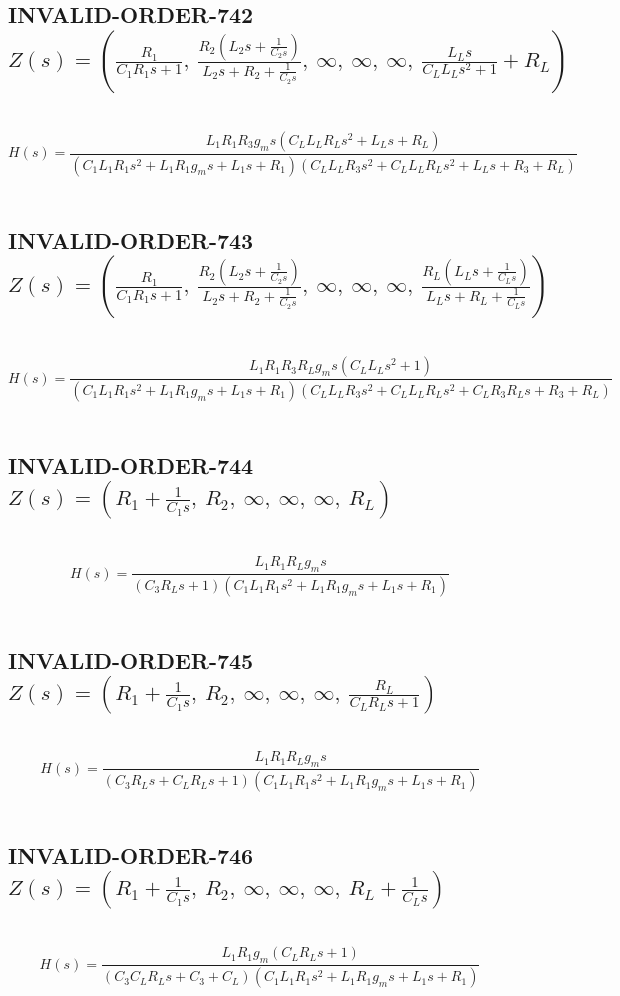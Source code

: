 \documentclass{article}
\begin{document}
\subsection{INVALID-ORDER-742 $Z(s) = \left( \frac{R_{1}}{C_{1} R_{1} s + 1}, \  \frac{R_{2} \left(L_{2} s + \frac{1}{C_{2} s}\right)}{L_{2} s + R_{2} + \frac{1}{C_{2} s}}, \  \infty, \  \infty, \  \infty, \  \frac{L_{L} s}{C_{L} L_{L} s^{2} + 1} + R_{L}\right)$ } \ 
\textbf{\[H(s) = \frac{L_{1} R_{1} R_{3} g_{m} s \left(C_{L} L_{L} R_{L} s^{2} + L_{L} s + R_{L}\right)}{\left(C_{1} L_{1} R_{1} s^{2} + L_{1} R_{1} g_{m} s + L_{1} s + R_{1}\right) \left(C_{L} L_{L} R_{3} s^{2} + C_{L} L_{L} R_{L} s^{2} + L_{L} s + R_{3} + R_{L}\right)}\] } \ 
\subsection{INVALID-ORDER-743 $Z(s) = \left( \frac{R_{1}}{C_{1} R_{1} s + 1}, \  \frac{R_{2} \left(L_{2} s + \frac{1}{C_{2} s}\right)}{L_{2} s + R_{2} + \frac{1}{C_{2} s}}, \  \infty, \  \infty, \  \infty, \  \frac{R_{L} \left(L_{L} s + \frac{1}{C_{L} s}\right)}{L_{L} s + R_{L} + \frac{1}{C_{L} s}}\right)$ } \ 
\textbf{\[H(s) = \frac{L_{1} R_{1} R_{3} R_{L} g_{m} s \left(C_{L} L_{L} s^{2} + 1\right)}{\left(C_{1} L_{1} R_{1} s^{2} + L_{1} R_{1} g_{m} s + L_{1} s + R_{1}\right) \left(C_{L} L_{L} R_{3} s^{2} + C_{L} L_{L} R_{L} s^{2} + C_{L} R_{3} R_{L} s + R_{3} + R_{L}\right)}\] } \ 
\subsection{INVALID-ORDER-744 $Z(s) = \left( R_{1} + \frac{1}{C_{1} s}, \  R_{2}, \  \infty, \  \infty, \  \infty, \  R_{L}\right)$ } \ 
\textbf{\[H(s) = \frac{L_{1} R_{1} R_{L} g_{m} s}{\left(C_{3} R_{L} s + 1\right) \left(C_{1} L_{1} R_{1} s^{2} + L_{1} R_{1} g_{m} s + L_{1} s + R_{1}\right)}\] } \ 
\subsection{INVALID-ORDER-745 $Z(s) = \left( R_{1} + \frac{1}{C_{1} s}, \  R_{2}, \  \infty, \  \infty, \  \infty, \  \frac{R_{L}}{C_{L} R_{L} s + 1}\right)$ } \ 
\textbf{\[H(s) = \frac{L_{1} R_{1} R_{L} g_{m} s}{\left(C_{3} R_{L} s + C_{L} R_{L} s + 1\right) \left(C_{1} L_{1} R_{1} s^{2} + L_{1} R_{1} g_{m} s + L_{1} s + R_{1}\right)}\] } \ 
\subsection{INVALID-ORDER-746 $Z(s) = \left( R_{1} + \frac{1}{C_{1} s}, \  R_{2}, \  \infty, \  \infty, \  \infty, \  R_{L} + \frac{1}{C_{L} s}\right)$ } \ 
\textbf{\[H(s) = \frac{L_{1} R_{1} g_{m} \left(C_{L} R_{L} s + 1\right)}{\left(C_{3} C_{L} R_{L} s + C_{3} + C_{L}\right) \left(C_{1} L_{1} R_{1} s^{2} + L_{1} R_{1} g_{m} s + L_{1} s + R_{1}\right)}\] } \ 
\end{document}

